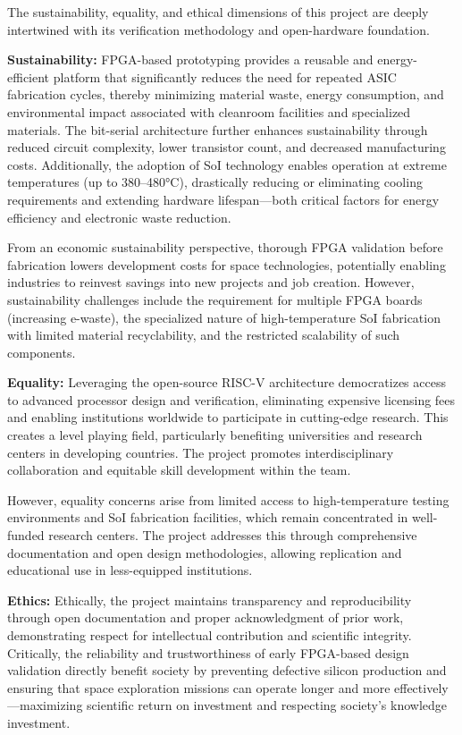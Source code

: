 \documentclass[10pt,twocolumn]{article}
\begin{document}
The sustainability, equality, and ethical dimensions of this project are deeply intertwined with its verification methodology and open-hardware foundation.

\textbf{Sustainability:} FPGA-based prototyping provides a reusable and energy-efficient platform that significantly reduces the need for repeated ASIC fabrication cycles, thereby minimizing material waste, energy consumption, and environmental impact associated with cleanroom facilities and specialized materials. The bit-serial architecture further enhances sustainability through reduced circuit complexity, lower transistor count, and decreased manufacturing costs. Additionally, the adoption of SoI technology enables operation at extreme temperatures (up to 380--480°C), drastically reducing or eliminating cooling requirements and extending hardware lifespan---both critical factors for energy efficiency and electronic waste reduction.

From an economic sustainability perspective, thorough FPGA validation before fabrication lowers development costs for space technologies, potentially enabling industries to reinvest savings into new projects and job creation. However, sustainability challenges include the requirement for multiple FPGA boards (increasing e-waste), the specialized nature of high-temperature SoI fabrication with limited material recyclability, and the restricted scalability of such components.

\textbf{Equality:} Leveraging the open-source RISC-V architecture democratizes access to advanced processor design and verification, eliminating expensive licensing fees and enabling institutions worldwide to participate in cutting-edge research. This creates a level playing field, particularly benefiting universities and research centers in developing countries. The project promotes interdisciplinary collaboration and equitable skill development within the team.

However, equality concerns arise from limited access to high-temperature testing environments and SoI fabrication facilities, which remain concentrated in well-funded research centers. The project addresses this through comprehensive documentation and open design methodologies, allowing replication and educational use in less-equipped institutions.

\textbf{Ethics:} Ethically, the project maintains transparency and reproducibility through open documentation and proper acknowledgment of prior work, demonstrating respect for intellectual contribution and scientific integrity. Critically, the reliability and trustworthiness of early FPGA-based design validation directly benefit society by preventing defective silicon production and ensuring that space exploration missions can operate longer and more effectively---maximizing scientific return on investment and respecting society's knowledge investment.
\end{document}
